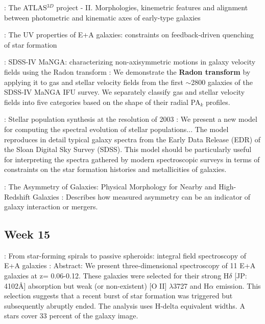 \documentclass[ceqn,usenatbib,onecolumn]{mnras}
\begin{document}
\par \citet{2011MNRAS.414.2923K} : {The ATLAS$^{3D}$ project - II. Morphologies, kinemetric features and alignment between photometric and kinematic axes of early-type galaxies}
\par \citet{2007MNRAS.382..960K} : {The UV properties of E+A galaxies: constraints on feedback-driven quenching of star formation}
\par \citet{2018MNRAS.480.2217S} : {SDSS-IV MaNGA: characterizing non-axisymmetric motions in galaxy velocity fields using the Radon transform} :  We demonstrate the \textbf{Radon transform} by applying it to gas and stellar velocity fields from the first $\sim$2800 galaxies of the SDSS-IV MaNGA IFU survey. We separately classify gas and stellar velocity fields into five categories based on the shape of their radial PA$_k$ profiles. 
\par \citet{2003MNRAS.344.1000B} : {Stellar population synthesis at the resolution of 2003} : We present a new model for computing the spectral evolution of stellar populations... The model reproduces in detail typical galaxy spectra from the Early Data Release (EDR) of the Sloan Digital Sky Survey (SDSS). This model should be particularly useful for interpreting the spectra gathered by modern spectroscopic surveys in terms of constraints on the star formation histories and metallicities of galaxies.


\par \citet{2000ApJ...529..886C} : {The Asymmetry of Galaxies: Physical Morphology for Nearby and High-Redshift Galaxies} : Describes how measured asymmetry can be an indicator of galaxy interaction or mergers.

\subsection{Week 15}
\par \citet{2012MNRAS.420..672S} : {From star-forming spirals to passive spheroids: integral field spectroscopy of E+A galaxies} : Abstract: We present three-dimensional spectroscopy of 11 E+A galaxies at z= 0.06-0.12. These galaxies were selected for their strong H$\delta$ [JP: 4102\AA] absorption but weak (or non-existent) [O II] $\lambda$3727 and H$\alpha$ emission. This selection suggests that a recent burst of star formation was triggered but subsequently abruptly ended. The analysis uses H-delta equivalent widths. A stars cover 33 percent of the galaxy image. 
\end{document}
